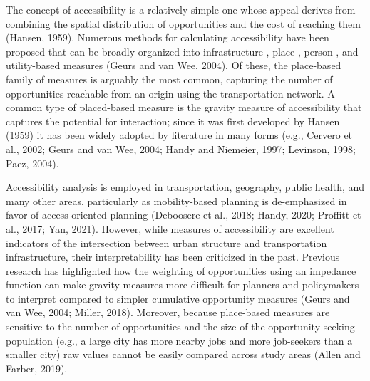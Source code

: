 \documentclass[]{elsarticle} %
\begin{document}
The concept of accessibility is a relatively simple one whose appeal
derives from combining the spatial distribution of opportunities and the
cost of reaching them (Hansen, 1959). Numerous methods for calculating
accessibility have been proposed that can be broadly organized into
infrastructure-, place-, person-, and utility-based measures (Geurs and
van Wee, 2004). Of these, the place-based family of measures is arguably
the most common, capturing the number of opportunities reachable from an
origin using the transportation network. A common type of placed-based
measure is the gravity measure of accessibility that captures the
potential for interaction; since it was first developed by Hansen (1959)
it has been widely adopted by literature in many forms (e.g., Cervero et
al., 2002; Geurs and van Wee, 2004; Handy and Niemeier, 1997; Levinson,
1998; Paez, 2004).

Accessibility analysis is employed in transportation, geography, public
health, and many other areas, particularly as mobility-based planning is
de-emphasized in favor of access-oriented planning (Deboosere et al.,
2018; Handy, 2020; Proffitt et al., 2017; Yan, 2021). However, while
measures of accessibility are excellent indicators of the intersection
between urban structure and transportation infrastructure, their
interpretability has been criticized in the past. Previous research has
highlighted how the weighting of opportunities using an impedance
function can make gravity measures more difficult for planners and
policymakers to interpret compared to simpler cumulative opportunity
measures (Geurs and van Wee, 2004; Miller, 2018). Moreover, because
place-based measures are sensitive to the number of opportunities and
the size of the opportunity-seeking population (e.g., a large city has
more nearby jobs and more job-seekers than a smaller city) raw values
cannot be easily compared across study areas (Allen and Farber, 2019).
\end{document}
